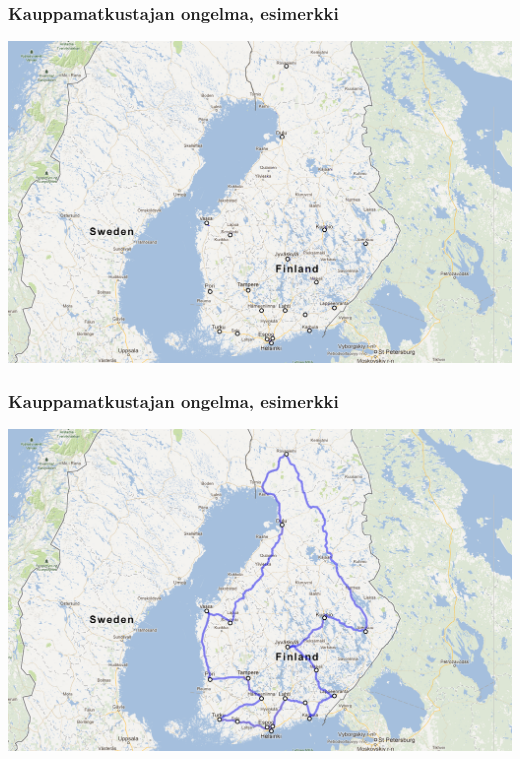\documentclass{beamer}
\begin{document}
    
    \begin{frame}
  \frametitle{Kauppamatkustajan ongelma, esimerkki}   %
\centering
\includegraphics[scale=0.25]{tspdemo01}
    \end{frame}
    
        \begin{frame}
  \frametitle{Kauppamatkustajan ongelma, esimerkki}   %
\centering
\includegraphics[scale=0.25]{tspdemo02}
    \end{frame}
    
\end{document}
